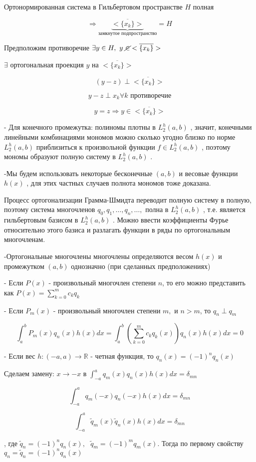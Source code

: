 \documentclass[12pt, a4paper]{report}
\begin{document}
Ортонормированная система в Гильбертовом пространстве \( H \) полная 

\[ \Rightarrow \underbrace{<\overline{\{x_k \}}  >}_{\text{замкнутое подпространство} } =H \] 

Предположим противоречие \( \exists  y \in  H , \text{ } y \text{ } \cancel{\in } <\overline{\{x_k \}}  > \) 

\( \exists   \) ортогональная  проекция  \( y  \) на \( <\overline{\{x_k \}}  > \) 

\[ (y -z )  \perp <\overline{\{x_k \}}  > \] 

\[ y- z \perp  x_k \forall  k \text{ противоречие}  \] 

\[ y = z \Rightarrow y \in <\overline{\{x_k \}}  > \] 

- Для конечного промежутка: полиномы плотны в \( L_2 ^h (a,b ) \) , значит, конечными линейными комбинациями мономов можно сколько угодно близко по норме \(  L_2 ^h (a,b ) \)  приблизиться к произвольной функции \( f \in  L_2 ^h (a,b ) \) , поэтому мономы образуют полную систему в \(  L_2 ^h (a,b ) \) . 

-Мы будем использовать некоторые бесконечные \( (a,b) \)  и весовые функции \( h(x) \) , для этих частных случаев полнота мономов тоже доказана. 

Процесс ортогонализации Грамма-Шмидта переводит полную систему в полную, поэтому система многочленов \(  q_0,q_1, \ldots, q_n, \ldots, \)  полна в \(  L_2 ^h (a,b ) \) , т.е. является гильбертовым базисом в \(  L_2 ^h (a,b ) \) . Можно ввести коэффициенты Фурье относительно этого базиса и разлагать функции в ряды по ортогональным многочленам.

-Ортогональные многочлены многочлены определяются весом \( h(x ) \) и промежутком \( (a,b) \) однозначно (при сделанных предположениях)

- Если \( P(x ) \) - произвольный многочлен степени \( n \), то его можно представить как \( P(x ) = \displaystyle  \sum_{k=0 }^ m c_k q_k \)  

- Если \( P_m(x ) \)  - произвольный многочлен степени \( m , \) и \( n>m \), то \( q_n \perp  q_m \) 

\[ \displaystyle  \int_{a }^{b } P_m(x ) q_n (x )h(x )dx = \int_{a }^{b      } \left( \sum_{k =0 }^m c_k q_k(x ) \right) q_n(x ) h(x ) dx = 0 \] 

- Если вес \( h: (-a , a ) \to  \mathbb{R} \) - четная функция, то \( q_n(x ) =(-1 )^n q_n (x ) \)

Сделаем замену: \( x \to  -x \text{ в }  \displaystyle  \int_{-a }^ a q_m (x )q_n(x )h(x )dx = \delta_{{mn}} \)

\[ \int_{-a }^{a } q_m (-x )q_n (-x )h(x )dx = \delta_{mn}  \]

\[ \int_{-a }^{a } \tilde{q }_m (x )\tilde{q }_n (x )h(x )dx = \delta_{mn} \] 

, где \( \tilde{q }_n =(-1 )^n q_n(x ), \text{ } \tilde{ q}_m = (-1 )^m q_m(x ) \). Тогда по первому свойству \( q_n = \tilde{q }_n = (-1 )^n q_n(x ) \)  




\ifdefined\mainfile
\else
    
\end{document}
